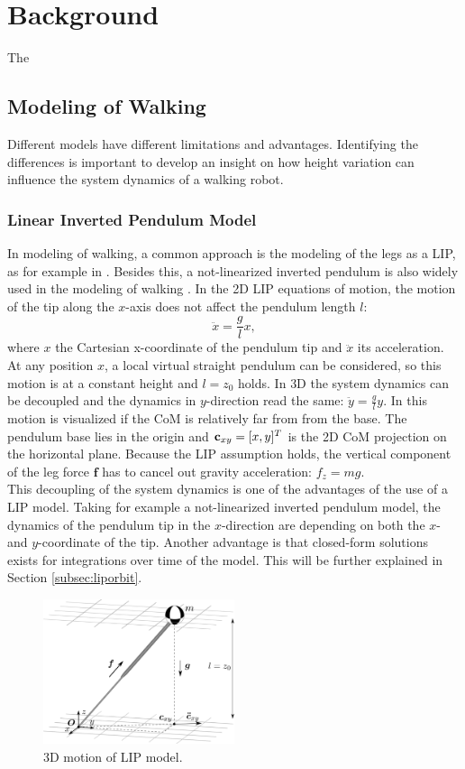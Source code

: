 %
\chapter{Background}
The 
\section{Modeling of Walking}
Different models have different limitations and advantages. Identifying the differences is important to develop an insight on how height variation can influence the system dynamics of a walking robot.
\subsection{Linear Inverted Pendulum Model}
In modeling of walking, a common approach is the modeling of the legs as a \acf{LIP}, as for example in \cite{kajita20013d}. Besides this, a not-linearized inverted pendulum is also widely used in the modeling of walking \cite{kuo2005energetic}.
In the \ac{2D} \ac{LIP} equations of motion, the motion of the tip along the $x$-axis does not affect the pendulum length $l$:
\begin{equation}
\ddot{x}=\frac{g}{l}x,
\label{eq:LIPeom}
\end{equation}
where $x$ the Cartesian x-coordinate of the pendulum tip and $\ddot{x}$ its acceleration.  At any position $x$, a local virtual straight pendulum can be considered, so this motion is at a constant height and $l=z_0$  holds. In \ac{3D} the system dynamics can be decoupled and the dynamics in $y$-direction read the same: $\ddot{y}=\frac{g}{l} y$. In  this motion is visualized if the \ac{CoM} is relatively far from from the base. The pendulum base lies in the origin and $\mathbf{c}_{xy} = [x,y]^T$ is the \ac{2D} \ac{CoM} projection on the horizontal plane. Because the \ac{LIP} assumption holds, the vertical component of the leg force $\boldsymbol{f}$ has to cancel out gravity acceleration: $f_z=mg$.\\
This decoupling of the system dynamics is one of the advantages of the use of a \ac{LIP} model. Taking for example a not-linearized inverted pendulum model, the dynamics of the pendulum tip in the $x$-direction are depending on both the $x$- and $y$-coordinate of the tip. Another advantage is that closed-form solutions exists for integrations over time of the model. This will be further explained in Section \ref{subsec:liporbit}.\\
\begin{figure}[h]
\centering
\includegraphics[width=0.5\textwidth]{STYLESTUFF/3DCoMwithoutfoot.png}
\caption{\ac{3D} motion of \ac{LIP} model.}
\label{fig:3dlip}
\end{figure}

